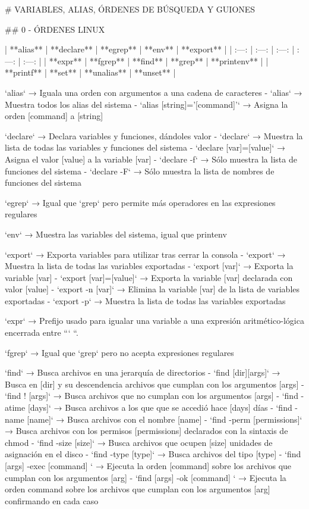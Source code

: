 # VARIABLES, ALIAS, ÓRDENES DE BÚSQUEDA Y GUIONES

## 0 - ÓRDENES LINUX

| **alias** | **declare** | **egrep** | **env** | **export** |
| :---: | :---: | :---: | :---: | :---: |
| **expr** | **fgrep** | **find** | **grep** | **printenv** |
| **printf** | **set** | **unalias** | **unset** |

`alias` → Iguala una orden con argumentos a una cadena de caracteres
- `alias` → Muestra todos los alias del sistema
- `alias [string]=’[command]’` → Asigna la orden [command] a [string]

`declare` → Declara variables y funciones, dándoles valor
- `declare` → Muestra la lista de todas las variables y funciones del sistema
- `declare [var]=[value]` → Asigna el valor [value] a la variable [var]
- `declare -f` → Sólo muestra la lista de funciones del sistema
- `declare -F` → Sólo muestra la lista de nombres de funciones del sistema

`egrep` → Igual que `grep` pero permite más operadores en las expresiones regulares

`env` → Muestra las variables del sistema, igual que printenv

`export` → Exporta variables para utilizar tras cerrar la consola
- `export` → Muestra la lista de todas las variables exportadas
- `export [var]` → Exporta la variable [var]
- `export [var]=[value]` → Exporta la variable [var] declarada con valor [value]
- `export -n [var]` → Elimina la variable [var] de la lista de variables exportadas
- `export -p` → Muestra la lista de todas las variables exportadas

`expr` → Prefijo usado para igualar una variable a una expresión aritmético-lógica encerrada entre ``` ``.

`fgrep` → Igual que `grep` pero no acepta expresiones regulares

`find` → Busca archivos en una jerarquía de directorios
- `find [dir][args]` → Busca en [dir] y su descendencia archivos que cumplan con los argumentos [args]
- `find ! [args]` → Busca archivos que no cumplan con los argumentos [args]
- `find -atime [days]` → Busca archivos a los que que se accedió hace [days] días
- `find -name [name]` → Busca archivos con el nombre [name]
- `find -perm [permissions]` → Busca archivos con los permisos [permissions] declarados con la sintaxis de chmod
- `find -size [size]` → Busca archivos que ocupen [size] unidades de asignación en el disco
- `find -type [type]` → Busca archivos del tipo [type]
- `find [args] -exec [command] \;` → Ejecuta la orden [command] sobre los archivos que cumplan con los argumentos [arg]
- `find [args] -ok [command] \;` → Ejecuta la orden command sobre los archivos que cumplan con los argumentos [arg] confirmando en cada caso


